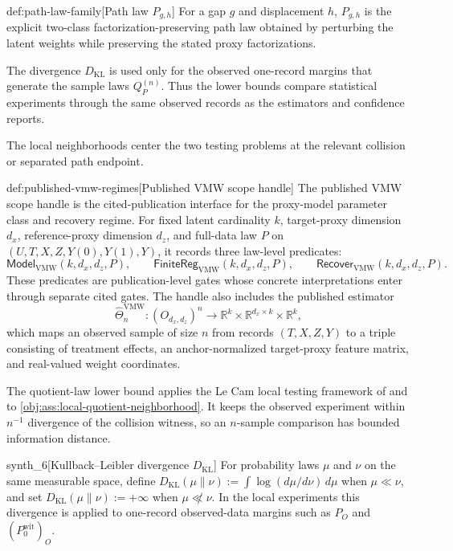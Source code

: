 \begin{definitionv}{def:path-law-family}[Path law \(P_{g,h}\)]
For a gap \(g\) and displacement \(h\), \(P_{g,h}\) is the explicit two-class factorization-preserving path law obtained by perturbing the latent weights while preserving the stated proxy factorizations.
\end{definitionv}

The divergence \(D_{\mathrm{KL}}\) is used only for the observed one-record margins that generate the sample laws \(Q_P^{(n)}\). Thus the lower bounds compare statistical experiments through the same observed records as the estimators and confidence reports.

The local neighborhoods center the two testing problems at the relevant collision or separated path endpoint.

\begin{definitionv}{def:published-vmw-regimes}[Published VMW scope handle]
The published VMW scope handle is the cited-publication interface for the proxy-model parameter class and recovery regime. For fixed latent cardinality \(k\), target-proxy dimension \(d_x\), reference-proxy dimension \(d_z\), and full-data law \(P\) on \((U,T,X,Z,Y(0),Y(1),Y)\), it records three law-level predicates:
\[
\mathsf{Model}_{\mathrm{VMW}}(k,d_x,d_z,P),
\qquad
\mathsf{FiniteReg}_{\mathrm{VMW}}(k,d_x,d_z,P),
\qquad
\mathsf{Recover}_{\mathrm{VMW}}(k,d_x,d_z,P).
\]
These predicates are publication-level gates whose concrete interpretations enter through separate cited gates. The handle also includes the published estimator
\[
\widehat\Theta^{\mathrm{VMW}}_n:
(O_{d_x,d_z})^n
\to
\mathbb R^k\times\mathbb R^{d_x\times k}\times\mathbb R^k,
\]
which maps an observed sample of size \(n\) from records \((T,X,Z,Y)\) to a triple consisting of treatment effects, an anchor-normalized target-proxy feature matrix, and real-valued weight coordinates.
\end{definitionv}

The quotient-law lower bound applies the Le Cam local testing framework of \citet{LeCam1986} and \citet{PolyanskiyWu2019} to \cref{obj:ass:local-quotient-neighborhood}. It keeps the observed experiment within \(n^{-1}\) divergence of the collision witness, so an \(n\)-sample comparison has bounded information distance.

\begin{definitionv}{synth_6}[Kullback--Leibler divergence $D_{\mathrm{KL}}$]
For probability laws $\mu$ and $\nu$ on the same measurable space, define $D_{\mathrm{KL}}(\mu\|\nu):=\int \log(d\mu/d\nu)\,d\mu$ when $\mu\ll\nu$, and set $D_{\mathrm{KL}}(\mu\|\nu):=+\infty$ when $\mu\not\ll\nu$. In the local experiments this divergence is applied to one-record observed-data margins such as $P_O$ and $(P_0^{\mathrm{wit}})_O$.
\end{definitionv}

